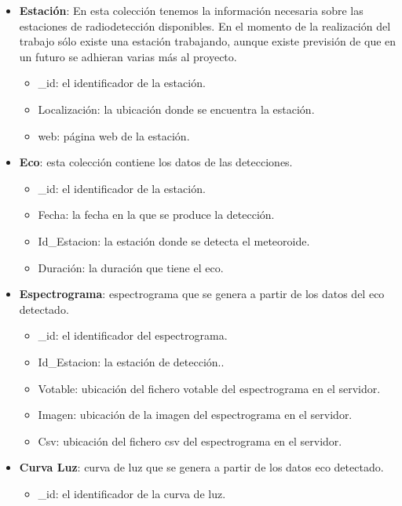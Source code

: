 \begin{itemize}
    \item \textbf{Estación}: En esta colección tenemos la información necesaria sobre las estaciones de radiodetección disponibles. En el momento de la realización del trabajo sólo existe una estación trabajando, aunque existe previsión de que en un futuro se adhieran varias más al proyecto. 
        \begin{itemize}
            \item \_id: el identificador de la estación.
            \item Localización: la ubicación donde se encuentra la estación.
            \item web: página web de la estación.
        \end{itemize}
    \item \textbf{Eco}: esta colección contiene los datos de las detecciones.
        \begin{itemize}
            \item \_id: el identificador de la estación.
            \item Fecha: la fecha en la que se produce la detección.
            \item Id\_Estacion: la estación donde se detecta el meteoroide.
            \item Duración: la duración que tiene el eco.
        \end{itemize}
    \item \textbf{Espectrograma}: espectrograma que se genera a partir de los datos del eco detectado.
        \begin{itemize}
            \item \_id: el identificador del espectrograma.
            \item Id\_Estacion: la estación de detección..
            \item Votable: ubicación del fichero votable del espectrograma en el servidor.
            \item Imagen: ubicación de la imagen del espectrograma en el servidor.
            \item Csv: ubicación del fichero csv del espectrograma en el servidor.
        \end{itemize}
    \item \textbf{Curva Luz}: curva de luz que se genera a partir de los datos eco detectado.
        \begin{itemize}
            \item \_id: el identificador de la curva de luz.

\end{itemize}
\end{itemize}
